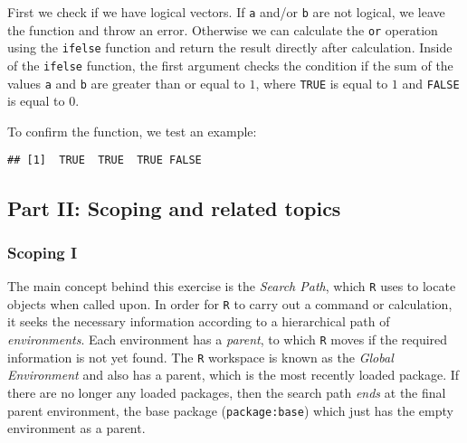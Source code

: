 \documentclass[11,]{article}
\newenvironment{Shaded}{\begin{snugshade}}{\end{snugshade}}
\newcommand{\KeywordTok}[1]{\textcolor[rgb]{0.13,0.29,0.53}{\textbf{{#1}}}}
\newcommand{\StringTok}[1]{\textcolor[rgb]{0.31,0.60,0.02}{{#1}}}
\newcommand{\OtherTok}[1]{\textcolor[rgb]{0.56,0.35,0.01}{{#1}}}
\newcommand{\NormalTok}[1]{{#1}}
\begin{document}
First we check if we have logical vectors. If \texttt{a} and/or
\texttt{b} are not logical, we leave the function and throw an error.
Otherwise we can calculate the \texttt{or} operation using the
\texttt{ifelse} function and return the result directly after
calculation. Inside of the \texttt{ifelse} function, the first argument
checks the condition if the sum of the values \texttt{a} and \texttt{b}
are greater than or equal to \(1\), where \texttt{TRUE} is equal to
\(1\) and \texttt{FALSE} is equal to \(0\).

To confirm the function, we test an example:

\begin{Shaded}
\end{Shaded}

\begin{verbatim}
## [1]  TRUE  TRUE  TRUE FALSE
\end{verbatim}

\subsection{Part II: Scoping and related
topics}\label{part-ii-scoping-and-related-topics}

\subsubsection{Scoping I}\label{scoping-i}

The main concept behind this exercise is the \emph{Search Path}, which
\texttt{R} uses to locate objects when called upon. In order for
\texttt{R} to carry out a command or calculation, it seeks the necessary
information according to a hierarchical path of \emph{environments}.
Each environment has a \emph{parent}, to which \texttt{R} moves if the
required information is not yet found. The \texttt{R} workspace is known
as the \emph{Global Environment} and also has a parent, which is the
most recently loaded package. If there are no longer any loaded
packages, then the search path \emph{ends} at the final parent
environment, the base package (\texttt{package:base}) which just has the
empty environment as a parent.
\end{document}
